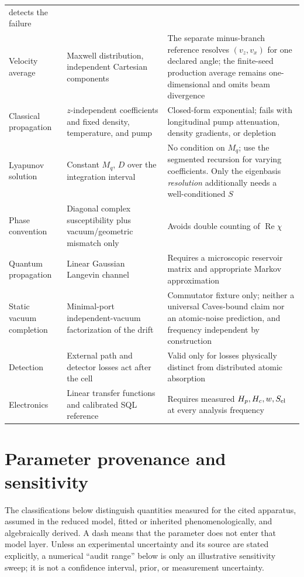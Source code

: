 \documentclass[11pt,a4paper]{article}
\newcommand{\Rea}{\operatorname{Re}}
\begin{document}
\begin{longtable}{L{3.4cm}L{5.0cm}L{5.6cm}}
detects the failure\\
Velocity average & Maxwell distribution, independent Cartesian components &
The separate minus-branch reference resolves $(v_z,v_x)$ for one declared
angle; the finite-seed production average remains one-dimensional and omits
beam divergence\\
Classical propagation & $z$-independent coefficients and fixed density,
temperature, and pump & Closed-form exponential; fails with longitudinal
pump attenuation, density gradients, or depletion\\
Lyapunov solution & Constant $M_q$, $D$ over the integration interval &
No condition on $M_q$; use the segmented recursion for varying coefficients.
Only the eigenbasis \emph{resolution} additionally needs a well-conditioned
$S$\\
Phase convention & Diagonal complex susceptibility plus vacuum/geometric
mismatch only & Avoids double counting of $\Rea\chi$\\
Quantum propagation & Linear Gaussian Langevin channel & Requires a
microscopic reservoir matrix and appropriate Markov approximation\\
Static vacuum completion & Minimal-port independent-vacuum factorization of
the drift & Commutator fixture only; neither a universal Caves-bound claim nor
an atomic-noise prediction, and frequency independent by construction\\
Detection & External path and detector losses act after the cell &
Valid only for losses physically distinct from distributed atomic absorption\\
Electronics & Linear transfer functions and calibrated SQL reference &
Requires measured $H_p,H_c,w,S_{\rm el}$ at every analysis frequency\\
\end{longtable}

\section{Parameter provenance and sensitivity}
\label{app:parameters}

The classifications below distinguish quantities measured for the cited
apparatus, assumed in the reduced model, fitted or inherited
phenomenologically, and algebraically derived. A dash means that the
parameter does not enter that model layer. Unless an experimental uncertainty
and its source are stated explicitly, a numerical ``audit range'' below is only
an illustrative sensitivity sweep; it is not a confidence interval, prior, or
measurement uncertainty.
\end{document}
